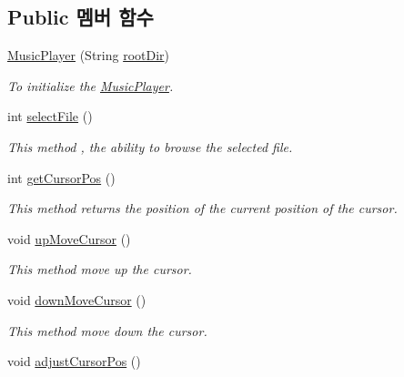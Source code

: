 \subsection*{Public 멤버 함수}
\begin{DoxyCompactItemize}
\item 
\hyperlink{classkr_1_1ac_1_1kookmin_1_1cs_1_1music_1_1_music_player_a4eada02529f380a25164797ea5fa778e}{Music\+Player} (String \hyperlink{classkr_1_1ac_1_1kookmin_1_1cs_1_1music_1_1_music_player_a38c60f5f214d244f8da3ba7287d29a39}{root\+Dir})
\begin{DoxyCompactList}\small\item\em To initialize the \hyperlink{classkr_1_1ac_1_1kookmin_1_1cs_1_1music_1_1_music_player}{Music\+Player}. \end{DoxyCompactList}\item 
int \hyperlink{classkr_1_1ac_1_1kookmin_1_1cs_1_1music_1_1_music_player_ad8a2c07b231ca2142a74cd0fd279a548}{select\+File} ()
\begin{DoxyCompactList}\small\item\em This method , the ability to browse the selected file. \end{DoxyCompactList}\item 
int \hyperlink{classkr_1_1ac_1_1kookmin_1_1cs_1_1music_1_1_music_player_a287f9f17c8f9c780a0012c40f529d26f}{get\+Cursor\+Pos} ()
\begin{DoxyCompactList}\small\item\em This method returns the position of the current position of the cursor. \end{DoxyCompactList}\item 
void \hyperlink{classkr_1_1ac_1_1kookmin_1_1cs_1_1music_1_1_music_player_a3dd6eb813563681e38a8dd9c981e886e}{up\+Move\+Cursor} ()
\begin{DoxyCompactList}\small\item\em This method move up the cursor. \end{DoxyCompactList}\item 
void \hyperlink{classkr_1_1ac_1_1kookmin_1_1cs_1_1music_1_1_music_player_a6c1889cdb80e7b51c8f05f0296c9e28a}{down\+Move\+Cursor} ()
\begin{DoxyCompactList}\small\item\em This method move down the cursor. \end{DoxyCompactList}\item 
void \hyperlink{classkr_1_1ac_1_1kookmin_1_1cs_1_1music_1_1_music_player_a2244c315124be0b5818e39f729b08f7c}{adjust\+Cursor\+Pos} ()

\end{DoxyCompactItemize}
